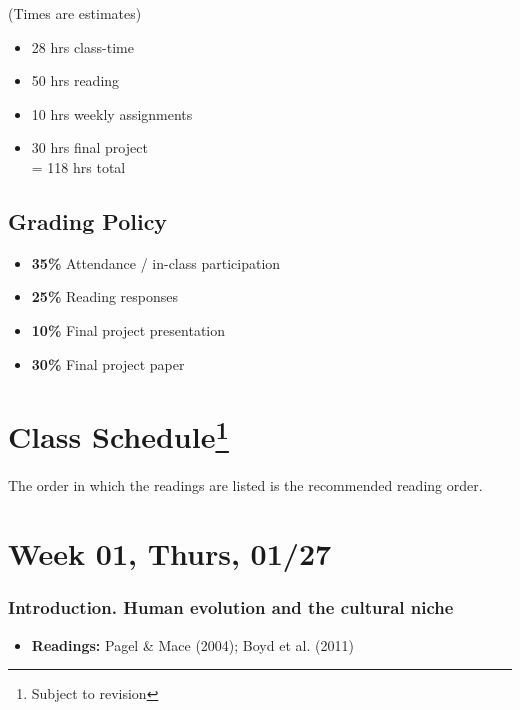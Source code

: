 \documentclass[11pt,man]{article}
\providecommand{\tightlist}{%
  \setlength{\itemsep}{0pt}\setlength{\parskip}{0pt}}
\begin{document}
(Times are estimates)

\begin{itemize}
\tightlist
\item
  28 hrs class-time
\item
  50 hrs reading
\item
  10 hrs weekly assignments
\item
  30 hrs final project\\
  = 118 hrs total
\end{itemize}

\hypertarget{grading-policy}{%
\subsection{Grading Policy}\label{grading-policy}}

\begin{itemize}
\tightlist
\item
  \textbf{35\%} Attendance / in-class participation
\item
  \textbf{25\%} Reading responses
\item
  \textbf{10\%} Final project presentation
\item
  \textbf{30\%} Final project paper
\end{itemize}

\hypertarget{class-schedule2}{%
\section[Class Schedule]{\texorpdfstring{Class
Schedule\footnote{Subject to revision}}{Class Schedule}}\label{class-schedule2}}

The order in which the readings are listed is the recommended reading
order.

\hypertarget{week-01-thurs-0127}{%
\section{Week 01, Thurs, 01/27}\label{week-01-thurs-0127}}

\hypertarget{introduction.-human-evolution-and-the-cultural-niche}{%
\subsubsection{Introduction. Human evolution and the cultural
niche}\label{introduction.-human-evolution-and-the-cultural-niche}}

\begin{itemize}
\tightlist
\item
  \textbf{Readings:} Pagel \& Mace (2004); Boyd et al. (2011)
\end{itemize}
\end{document}
